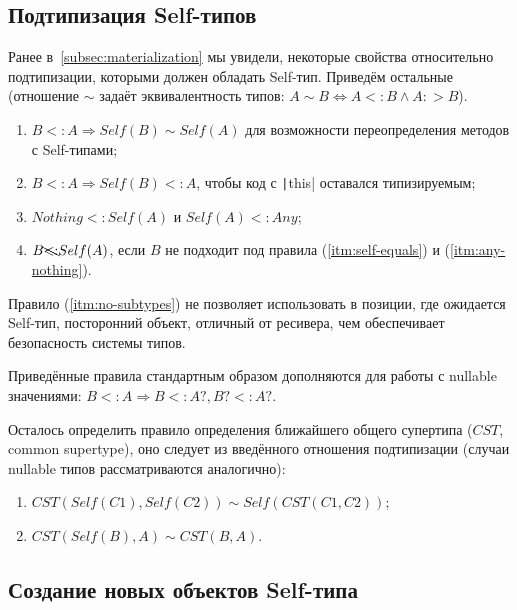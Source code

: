 

\subsection{Подтипизация Self-типов} \label{subsec:self-subtyping}

Ранее в~\ref{subsec:materialization} мы увидели, некоторые свойства относительно подтипизации, которыми должен обладать Self-тип.
Приведём остальные (отношение $\sim$ задаёт эквивалентность типов: $A \sim B \iff A <: B \land A :> B$).

\begin{enumerate}
    \item \label{itm:self-equals} $B <: A \Rightarrow Self(B) \sim Self(A)$ для возможности переопределения методов с Self-типами;
    \item \label{itm:this-subtype} $B <: A \Rightarrow Self(B) <: A$, чтобы код с \texttt|this| оставался типизируемым;
    \item \label{itm:any-nothing} $Nothing <: Self(A)$ и $Self(A) <: Any$;
    \item \label{itm:no-subtypes} $B \bcancel{<:} Self(A)$, если $B$ не подходит под правила (\ref{itm:self-equals}) и (\ref{itm:any-nothing}).
\end{enumerate}

Правило (\ref{itm:no-subtypes}) не позволяет использовать в позиции, где ожидается Self-тип, посторонний объект, отличный от ресивера, чем обеспечивает безопасность системы типов.

Приведённые правила стандартным образом дополняются для работы с nullable значениями:
$B <: A \Rightarrow B <: A?, B? <: A?$.

Осталось определить правило определения ближайшего общего супертипа ($CST$, common supertype), оно следует из введённого отношения подтипизации (случаи nullable типов рассматриваются аналогично):
\begin{enumerate}
    \item $CST(Self(C1), Self(C2)) \sim Self(CST(C1, C2))$;
    \item $CST(Self(B), A) \sim CST(B, A)$.
\end{enumerate}


\subsection{Создание новых объектов Self-типа}

